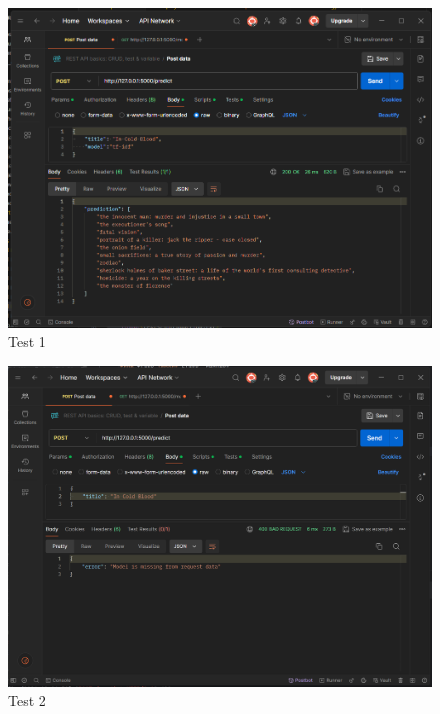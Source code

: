 \begin{figure}[htbp]
    \centering
    \includegraphics[width=1\textwidth]{../../assets/test_1.png}
    \caption{Test 1}
    \label{fig:test1}
\end{figure}
\begin{figure}[htbp]
    \centering
    \includegraphics[width=1\textwidth]{../../assets/test_2.png}
    \caption{Test 2}
    \label{fig:test2}
\end{figure}
